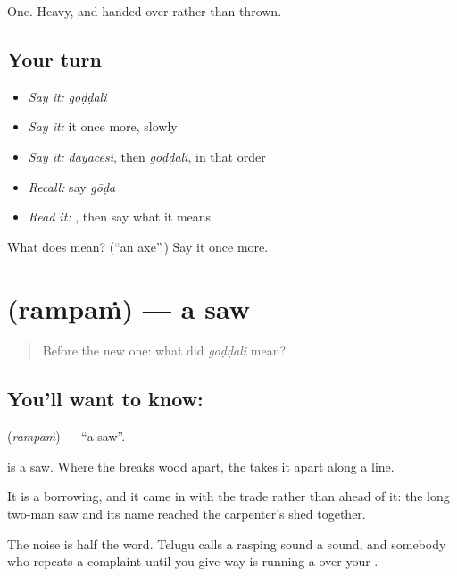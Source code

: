 \begin{grammarlens}[title={What you've built}]
One. Heavy, and handed over rather than thrown.
\end{grammarlens}

\subsection*{Your turn}
\begin{itemize}
\raggedright
  \item \emph{Say it:} \emph{goḍḍali}
  \item \emph{Say it:} it once more, slowly
  \item \emph{Say it:} \emph{dayacēsi}, then \emph{goḍḍali}, in that order
  \item \emph{Recall:} say \emph{gōḍa}
  \item \emph{Read it:} \textbf{}, then say what it means
\end{itemize}

\begin{tcolorbox}[breakable,colback=teal!4,colframe=teal!35!black,title={Before you move on}]
What does  mean? (\textquotedblleft{}an axe\textquotedblright{}.) Say it once more.
\end{tcolorbox}
\section[\texorpdfstring{\te{రంపం} (rampaṁ)}{రంపం (rampaṁ)}]{ (rampaṁ) — a saw}

\label{lesson:TE-C69-saw}



\begin{quote}
Before the new one: what did \emph{goḍḍali} mean?
\end{quote}

\subsection*{You'll want to know: }
\textbf{} (\emph{rampaṁ}) — \textquotedblleft{}a saw\textquotedblright{}.

 is a saw. Where the  breaks wood apart, the  takes it apart along a line.

It is a borrowing, and it came in with the trade rather than ahead of it: the long two-man saw and its name reached the carpenter's shed together.

The noise is half the word. Telugu calls a rasping sound a  sound, and somebody who repeats a complaint until you give way is running a  over your .

